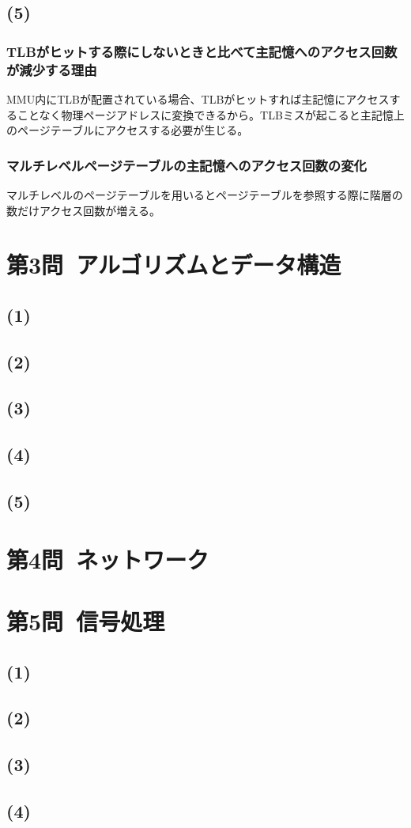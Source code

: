 \documentclass[a4paper,12pt,xelatex,ja=standard]{bxjsarticle}
\begin{document}
\subsection*{(5)}
\subsubsection*{TLBがヒットする際にしないときと比べて主記憶へのアクセス回数が減少する理由}
MMU内にTLBが配置されている場合、TLBがヒットすれば主記憶にアクセスすることなく物理ページアドレスに変換できるから。TLBミスが起こると主記憶上のページテーブルにアクセスする必要が生じる。

\subsubsection*{マルチレベルページテーブルの主記憶へのアクセス回数の変化}
マルチレベルのページテーブルを用いるとページテーブルを参照する際に階層の数だけアクセス回数が増える。

\section*{第3問\ アルゴリズムとデータ構造}
\subsection*{(1)}
\subsection*{(2)}
\subsection*{(3)}
\subsection*{(4)}
\subsection*{(5)}

\section*{第4問\ ネットワーク}

\section*{第5問\ 信号処理}
\subsection*{(1)}
\subsection*{(2)}
\subsection*{(3)}
\subsection*{(4)}
\end{document}
